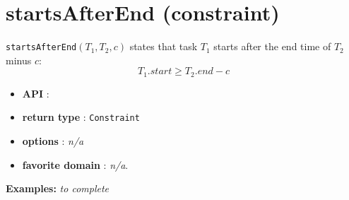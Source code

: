 \section{startsAfterEnd (constraint)}\label{startsafterend:startsafterendconstraint}\hypertarget{startsafterend:startsafterendconstraint}{}
\begin{notedef}
\texttt{startsAfterEnd}$(T_1,T_2,c)$  states that task $T_1$ starts after the end time of $T_2$ minus $c$:
  $$T_{1}.start \ge T_{2}.end - c$$
\end{notedef}

\begin{itemize}
	\item \textbf{API} :
	\item \textbf{return type} : \texttt{Constraint}
	\item \textbf{options} : \emph{n/a}
	\item \textbf{favorite domain} : \emph{n/a}.
\end{itemize}

\textbf{Examples:}
%
\emph{to complete}
